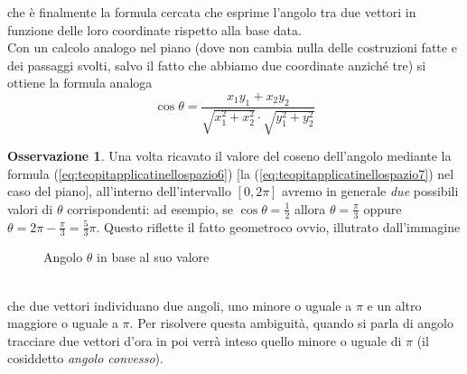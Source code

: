 \documentclass{book}
\theoremstyle{definition}
\newtheorem{oss}{Osservazione}[section]
\theoremstyle{plain}
\begin{document}
che è finalmente la formula cercata che esprime l'angolo tra due vettori in funzione delle loro coordinate rispetto alla base data.\\
Con un calcolo analogo nel piano (dove non cambia nulla delle costruzioni fatte e dei passaggi svolti, salvo il fatto che abbiamo due coordinate anziché tre) si ottiene la formula analoga
\begin{equation}
  \label{eq:teopitapplicatinellospazio7}
  \cos\theta = \frac{x_1y_1+x_2y_2}{\sqrt{x^2_1+x^2_2}\cdot\sqrt{y^2_1+y^2_2}}
\end{equation}
\begin{oss}
  \label{oss:teopitapplicatinellospazio}
  Una volta ricavato il valore del coseno dell'angolo mediante la formula (\ref{eq:teopitapplicatinellospazio6}) [la (\ref{eq:teopitapplicatinellospazio7}) nel caso del piano], all'interno dell'intervallo $\left[0,2\pi\right]$ avremo in generale \textit{due} possibili valori di $\theta$ corrispondenti: ad esempio, se $\cos\theta=\frac{1}{2}$ allora $\theta=\frac{\pi}{3}$ oppure $\theta=2\pi -\frac{\pi}{3}=\frac{5}{3}\pi$. Questo riflette il fatto geometroco ovvio, illutrato dall'immagine
  \begin{figure}[ht!]
    \centering
    \resizebox{3cm}{!}{
      
    }
    \caption{Angolo $\theta$ in base al suo valore}
    \label{fig:angolotheta}
  \end{figure}\\
  che due vettori individuano due angoli, uno minore o uguale a $\pi$ e un altro maggiore o uguale a $\pi$. Per risolvere questa ambiguità, quando si parla di angolo tracciare due vettori d'ora in poi verrà inteso quello minore o uguale di $\pi$ (il cosiddetto \textit{angolo convesso}).
\end{oss}
\end{document}
